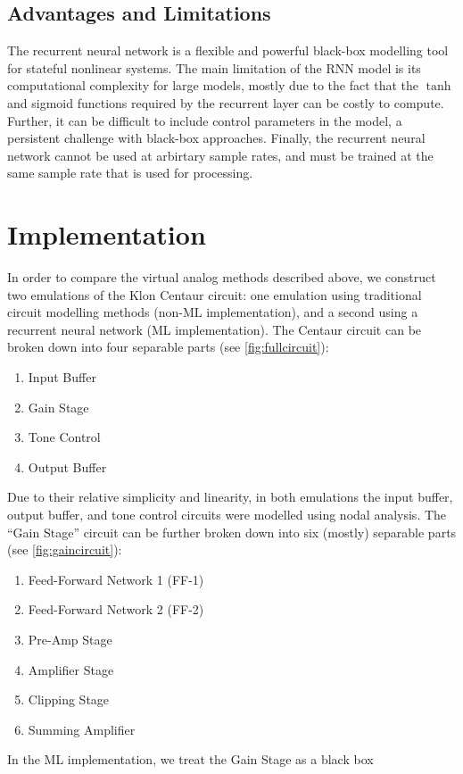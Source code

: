 \documentclass[twoside,a4paper]{article}
\begin{document}
\subsection{Advantages and Limitations}
The recurrent neural network is a flexible and powerful
black-box modelling tool for stateful nonlinear systems.
The main limitation of the RNN model is its computational
complexity for large models, mostly due to the fact that the
$\tanh$ and sigmoid functions required by the recurrent layer
can be costly to compute. Further, it can be difficult to include
control parameters in the model, a persistent challenge with
black-box approaches. Finally, the recurrent neural network
cannot be used at arbirtary sample rates, and must be trained
at the same sample rate that is used for processing.

\section{Implementation}
In order to compare the virtual analog methods described above,
we construct two emulations of the Klon Centaur circuit: one emulation
using traditional circuit modelling methods (non-ML implementation), and
a second using a recurrent neural network (ML implementation). The Centaur
circuit can be broken down into four separable parts (see \cref{fig:fullcircuit}):
\begin{enumerate}
    \item Input Buffer
    \item Gain Stage
    \item Tone Control
    \item Output Buffer
\end{enumerate}
%
Due to their relative simplicity and linearity, in both emulations the
input buffer, output buffer, and tone control circuits were modelled using
nodal analysis. The ``Gain Stage'' circuit can be further broken down
into six (mostly) separable parts (see \cref{fig:gaincircuit}):
\begin{enumerate}
    \item Feed-Forward Network 1 (FF-1)
    \item Feed-Forward Network 2 (FF-2)
    \item Pre-Amp Stage
    \item Amplifier Stage
    \item Clipping Stage
    \item Summing Amplifier
\end{enumerate}
%
In the ML implementation, we treat the Gain Stage as a black box
\end{document}
